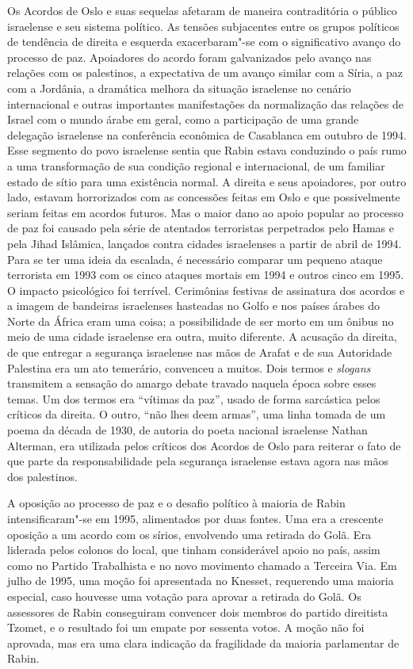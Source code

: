 Os Acordos de Oslo e suas sequelas afetaram de maneira contraditória o
público israelense e seu sistema político. As tensões subjacentes entre
os grupos políticos de tendência de direita e esquerda exacerbaram"-se
com o significativo avanço do processo de paz. Apoiadores do acordo
foram galvanizados pelo avanço nas relações com os palestinos, a
expectativa de um avanço similar com a Síria, a paz com a Jordânia, a
dramática melhora da situação israelense no cenário internacional e
outras importantes manifestações da normalização das relações de Israel
com o mundo árabe em geral, como a participação de uma grande delegação
israelense na conferência econômica de Casablanca em outubro de 1994.
Esse segmento do povo israelense sentia que Rabin estava conduzindo o
país rumo a uma transformação de sua condição regional e internacional,
de um familiar estado de sítio para uma existência normal. A direita e
seus apoiadores, por outro lado, estavam horrorizados com as concessões
feitas em Oslo e que possivelmente seriam feitas em acordos futuros. Mas
o maior dano ao apoio popular ao processo de paz foi causado pela
série de atentados terroristas perpetrados pelo Hamas e pela Jihad
Islâmica, lançados contra cidades israelenses a partir de abril de 1994.
Para se ter uma ideia da escalada, é necessário comparar um pequeno
ataque terrorista em 1993 com os cinco ataques mortais em 1994 e outros
cinco em 1995. O impacto psicológico foi terrível. Cerimônias festivas
de assinatura dos acordos e a imagem de bandeiras israelenses hasteadas
no Golfo e nos países árabes do Norte da África eram uma coisa; a
possibilidade de ser morto em um ônibus no meio de uma cidade israelense
era outra, muito diferente. A acusação da direita, de que entregar a
segurança israelense nas mãos de Arafat e de sua Autoridade Palestina
era um ato temerário, convenceu a muitos. Dois termos e \textit{slogans}
transmitem a sensação do amargo debate travado naquela época sobre esses
temas. Um dos termos era ``vítimas da paz'', usado de forma sarcástica
pelos críticos da direita. O outro, ``não lhes deem armas'', uma linha
tomada de um poema da década de 1930, de autoria do poeta nacional israelense Nathan
Alterman, era utilizada pelos críticos dos Acordos de Oslo para reiterar o
fato de que parte da responsabilidade pela segurança israelense estava
agora nas mãos dos palestinos.

A oposição ao processo de paz e o desafio político à maioria de Rabin
intensificaram"-se em 1995, alimentados por duas fontes. Uma era a
crescente oposição a um acordo com os sírios, envolvendo uma retirada do
Golã. Era liderada pelos colonos do local, que tinham considerável apoio
no país, assim como no Partido Trabalhista e no novo movimento chamado a
Terceira Via. Em julho de 1995, uma moção foi apresentada no Knesset,
requerendo uma maioria especial, caso houvesse uma votação para aprovar
a retirada do Golã. Os assessores de Rabin conseguiram convencer dois
membros do partido direitista Tzomet, e o resultado foi um empate por
sessenta votos. A moção não foi aprovada, mas era uma clara indicação da
fragilidade da maioria parlamentar de Rabin.

